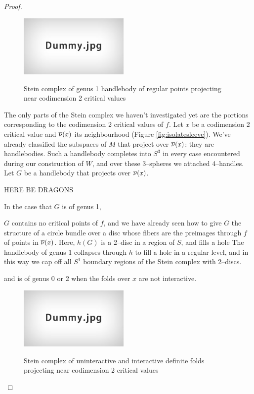 \begin{proof}
	\begin{figure}
		\centering
		\captionsetup{justification=centering}
		\caption{Stein complex of genus 1 handlebody of regular points projecting near codimension 2 critical values}
		\includegraphics[height=3cm]{figures/dummy.jpg}
		\label{fig:codim2steinregular}
	\end{figure}
	
	The only parts of the Stein complex we haven't investigated yet are the portions corresponding to the codimension 2 critical values of $f$.
	Let $x$ be a codimension 2 critical value and $\overline{\nu}(x)$ its neighbourhood (Figure \ref{fig:isolatesleeve}).
	We've already classified the subspaces of $M$ that project over $\overline{\nu}(x)$: they are handlebodies.
	Such a handlebody completes into $S^3$ in every case encountered during our construction of $W$, and over these 3--spheres we attached 4--handles.
	Let $G$ be a handlebody that projects over $\overline{\nu}(x)$.
												
												
												\newpage
												{
													HERE BE DRAGONS
												}
												\newpage
												
												
													In the case that $G$ is of genus 1, 
													
													$G$ contains no critical points of $f$, and we have already seen how to give $G$ the structure of a circle bundle over a disc whose fibers are the preimages through $f$ of points in $\overline{\nu}(x)$.
													Here, $h(G)$ is a 2--disc in a region of $S$, and fills a hole 
													The handlebody of genus 1 collapses through $h$ to fill a hole in a regular level, and in this way we cap off all $S^1$ boundary regions of the Stein complex with 2--discs.
													
													 and is of genus 0 or 2 when the folds over $x$ are not interactive.
												
													
													\begin{figure}
														\centering
														\captionsetup{justification=centering}
														\caption{Stein complex of uninteractive and interactive definite folds projecting near codimension 2 critical values}
														\includegraphics[height=3cm]{figures/dummy.jpg}
														\label{fig:codim2steindef}
													\end{figure}
													

\end{proof}
